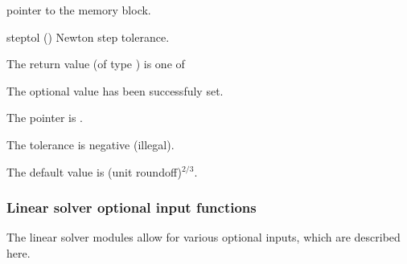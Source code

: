 {{\begin{args}
    pointer to the {\ida} memory block.
  \item[steptol] ()
    Newton step tolerance.
  \end{args}
}
{
  The return value  (of type ) is one of
  \begin{args}
  \item[\Id{IDA\_SUCCESS}] 
    The optional value has been successfuly set.
  \item[\Id{IDA\_MEM\_NULL}]
    The  pointer is .
  \item[\Id{IDA\_ILL\_INPUT}]
    The  tolerance is negative (illegal).
  \end{args}
}
{
  The default value is (unit roundoff)$^{2/3}$.
}
\subsubsection{Linear solver optional input functions}\label{sss:optin_linsol}
The linear solver modules allow for various optional inputs, which are
described here.
}
